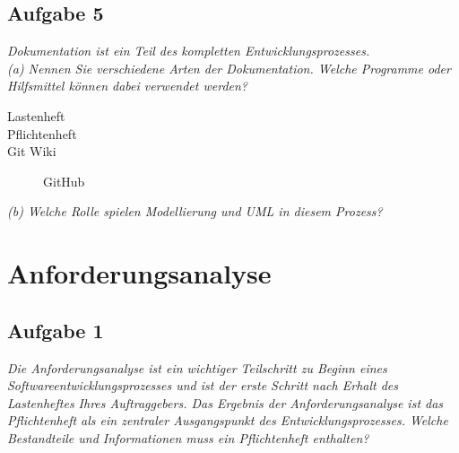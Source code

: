 \documentclass{article}
\begin{document}
\subsection{Aufgabe 5}
\textit{Dokumentation ist ein Teil des kompletten Entwicklungsprozesses.}\\
\textit{(a) Nennen Sie verschiedene Arten der Dokumentation. Welche Programme oder Hilfsmittel können dabei verwendet werden?}\\
\begin{description}
    \item[Lastenheft]
    \item[Pflichtenheft]
    \item[Git Wiki] GitHub 
\end{description}

\noindent\textit{(b) Welche Rolle spielen Modellierung und UML in diesem Prozess?}\\


\newpage
\section{Anforderungsanalyse}
\subsection{Aufgabe 1}
\textit{Die Anforderungsanalyse ist ein wichtiger Teilschritt zu Beginn eines Softwareentwicklungsprozesses und ist der erste Schritt nach Erhalt des Lastenheftes Ihres Auftraggebers. Das Ergebnis der Anforderungsanalyse ist das Pflichtenheft als ein zentraler Ausgangspunkt des Entwicklungsprozesses. Welche Bestandteile und Informationen muss ein Pflichtenheft enthalten?}\\
\end{document}
